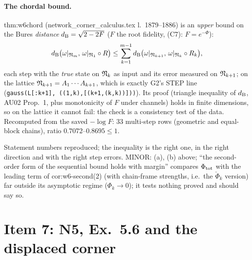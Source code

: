 \documentclass[11pt]{article}
\begin{document}
\paragraph{The chordal bound.} thm:w6chord (network\_corner\_calculus.tex l.~1879--1886) is an \emph{upper} bound
on the Bures \emph{distance} $d_{\rm B}=\sqrt{2-2F}$ ($F$ the root fidelity, (C7): $F=e^{-\Phi}$):
\[
d_{\rm B}\bigl(\omega|_{\mathfrak N_m},\,\omega|_{\mathfrak N_1}\circ R\bigr)\le\sum_{k=1}^{m-1}d_{\rm B}\bigl(\omega|_{\mathfrak N_{k+1}},\,\omega|_{\mathfrak N_k}\circ R_k\bigr),
\]
each step with the \emph{true} state on $\mathfrak N_k$ as input and its error measured on $\mathfrak N_{k+1}$; on the lattice
$\mathfrak N_{k+1}=A_1\cdots A_{k+1}$, which is exactly G2's STEP line (\texttt{gauss(L[:k+1], ((1,k),[(k+1,(k,k))]))}).
Its proof (triangle inequality of $d_{\rm B}$, AU02 Prop.~1, plus monotonicity of $F$ under channels) holds in
finite dimensions, so on the lattice it cannot fail: the check is a consistency test of the data. Recomputed from
the saved $-\log F$: 33 multi-step rows (geometric and equal-block chains), ratio $0.7072$--$0.8695\le1$.
\begin{verdictok}
Statement numbers reproduced; the inequality is the right one, in the right direction and with the right step
errors. MINOR: (a), (b) above; ``the second-order form of the sequential bound holds with margin'' compares
$\Phi_{\rm tot}$ with the leading term of cor:w6-second(2) (with chain-frame strengths, i.e.\ the $\check\Phi_k$
version) far outside its asymptotic regime ($\Phi_k\to0$); it tests nothing proved and should say so.
\end{verdictok}

\section{Item 7: N5, Ex.~5.6 and the displaced corner}\label{sec:i7}
\end{document}
